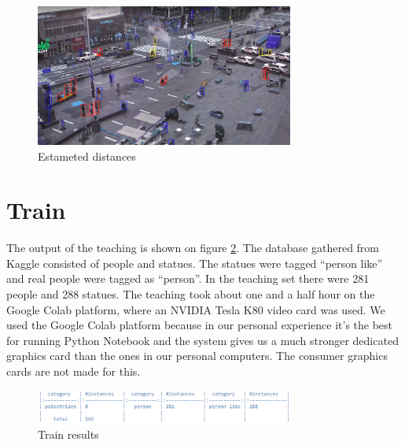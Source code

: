 \begin{figure}[!ht]
\centering
\includegraphics[width=85mm,keepaspectratio]{fig/distance_on_image.png}
\caption{Estameted distances}
\label{fig:distance} 
\end{figure}

\section{Train}
The output of the teaching is shown on figure \ref{fig:train}. The database gathered from Kaggle consisted of people and statues. The statues were tagged “person like” and real people were tagged as “person”. In the teaching set there were 281 people and 288 statues. The teaching took about one and a half hour on the Google Colab platform, where an NVIDIA Tesla K80 video card was used. We used the Google Colab platform because in our personal experience it’s the best for running Python Notebook and the system gives us a much stronger dedicated graphics card than the ones in our personal computers. The consumer graphics cards are not made for this.


\begin{figure}[!ht]
\centering
\includegraphics[width=85mm,keepaspectratio]{fig/train.png}
\caption{Train results}
\label{fig:train} 
\end{figure}

